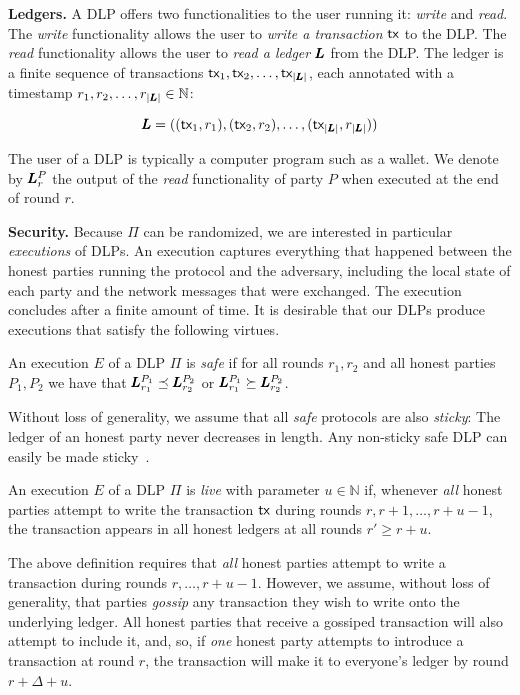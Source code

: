 \noindent
\textbf{Ledgers.}
A DLP offers two functionalities to the user running
it: \emph{write} and \emph{read}. The \emph{write} functionality allows the
user to \emph{write a transaction} $\textsf{tx}$ to the DLP. The \emph{read}
functionality allows the user to \emph{read a ledger} $\pmb{L}$ from the DLP.
The ledger is a finite sequence of transactions
$\textsf{tx}_1, \textsf{tx}_2, \ldots, \textsf{tx}_{|\pmb{L}|}$,
each annotated with a timestamp $r_1, r_2, \ldots, r_{|\pmb{L}|} \in \mathbb{N}$:

\[
  \pmb{L} = ((\textsf{tx}_1, r_1), (\textsf{tx}_2, r_2), \ldots, (\textsf{tx}_{|\pmb{L}|}, r_{|\pmb{L}|}))
\]

The user of a DLP is typically a computer program such as a wallet.
We denote by $\pmb{L}^P_r$ the output of the \emph{read} functionality of
party $P$ when executed at the end of round $r$.

\noindent
\textbf{Security.}
Because $\Pi$ can be randomized, we are interested in particular
\emph{executions} of DLPs. An execution captures
everything that happened between the honest parties running the
protocol and the adversary, including the local state of each
party and the network messages that were exchanged. The execution
concludes after a finite amount of time. It is desirable that our
DLPs produce executions that satisfy the following virtues.

\begin{definition}[Safe]
  An execution $E$ of a DLP $\Pi$ is \emph{safe} if for all rounds $r_1, r_2$
  and all honest parties $P_1, P_2$ we have that
  $\pmb{L}^{P_1}_{r_1} \preceq \pmb{L}^{P_2}_{r_2}$ or
  $\pmb{L}^{P_1}_{r_1} \succeq \pmb{L}^{P_2}_{r_2}$.
\end{definition}

Without loss of generality, we assume that all \emph{safe} protocols
are also \emph{sticky}: The ledger of an honest party never decreases in
length. Any non-sticky safe DLP can easily be made sticky~\cite{streamlet}.

\begin{definition}[Live]
  An execution $E$ of a DLP $\Pi$ is \emph{live} with parameter $u \in \mathbb{N}$ if, whenever
  \emph{all} honest parties attempt to write the transaction $\textsf{tx}$ during
  rounds $r, r + 1, \ldots, r + u - 1$, the transaction appears in all
  honest ledgers at all rounds $r' \geq r + u$.
\end{definition}

The above definition requires that \emph{all} honest parties attempt to
write a transaction during rounds $r, \ldots, r + u - 1$. However, we
assume, without loss of generality,
that parties \emph{gossip} any transaction they wish to write onto
the underlying ledger. All honest parties that receive a gossiped transaction
will also attempt to include it, and, so, if \emph{one} honest party
attempts to introduce a transaction at round $r$, the transaction will
make it to everyone's ledger by round $r + \Delta + u$.

